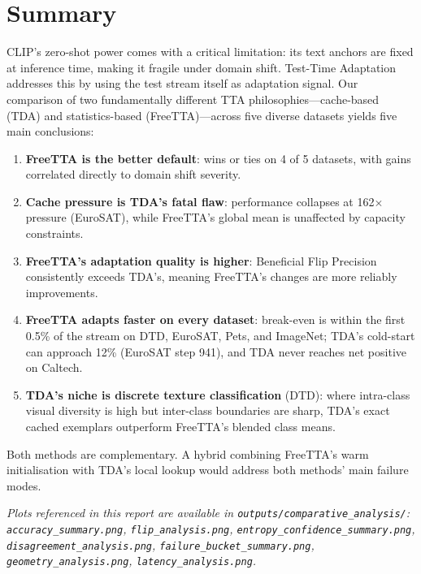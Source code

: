 \documentclass[12pt,a4paper]{article}
\newcommand{\1}{\mathbf{1}}
\begin{document}
\section*{Summary}

CLIP's zero-shot power comes with a critical limitation: its text anchors are fixed at inference time, making it fragile under domain shift.
Test-Time Adaptation addresses this by using the test stream itself as adaptation signal.
Our comparison of two fundamentally different TTA philosophies---cache-based (TDA) and statistics-based (FreeTTA)---across five diverse datasets yields five main conclusions:

\begin{enumerate}
  \item \textbf{FreeTTA is the better default}: wins or ties on 4 of 5 datasets, with gains correlated directly to domain shift severity.
  \item \textbf{Cache pressure is TDA's fatal flaw}: performance collapses at 162$\times$ pressure (EuroSAT), while FreeTTA's global mean is unaffected by capacity constraints.
  \item \textbf{FreeTTA's adaptation quality is higher}: Beneficial Flip Precision consistently exceeds TDA's, meaning FreeTTA's changes are more reliably improvements.
  \item \textbf{FreeTTA adapts faster on every dataset}: break-even is within the first 0.5\% of the stream on DTD, EuroSAT, Pets, and ImageNet; TDA's cold-start can approach 12\% (EuroSAT step 941), and TDA never reaches net positive on Caltech.
  \item \textbf{TDA's niche is discrete texture classification} (DTD): where intra-class visual diversity is high but inter-class boundaries are sharp, TDA's exact cached exemplars outperform FreeTTA's blended class means.
\end{enumerate}

Both methods are complementary.
A hybrid combining FreeTTA's warm initialisation with TDA's local lookup would address both methods' main failure modes.

\bigskip
\noindent
\textit{Plots referenced in this report are available in \texttt{outputs/comparative\_analysis/}:
\texttt{accuracy\_summary.png}, \texttt{flip\_analysis.png},
\texttt{entropy\_confidence\_summary.png}, \texttt{disagreement\_analysis.png},
\texttt{failure\_bucket\_summary.png}, \texttt{geometry\_analysis.png},
\texttt{latency\_analysis.png}.}
\end{document}
